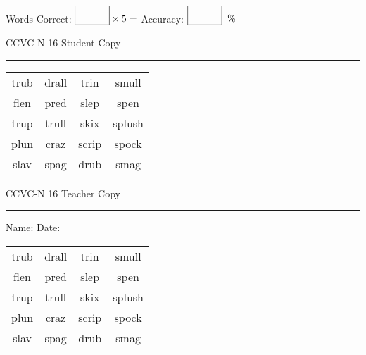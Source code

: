 \documentclass{memoir}
\begin{document}
\small

Words Correct: $\fbox{\phantom{\huge 100}} \times 5 = $ Accuracy: $\fbox{\phantom{\huge 100}}\;\; \%$ 

\vfill

\newpage


\footnotesize \noindent
CCVC-N 16 \hfill Student Copy
\smallskip
\hrule

\Large

\setlength{\tabcolsep}{14pt}
\def\arraystretch{3}

{\selectfont


\begin{vplace}[0.5]
\begin{center}
\begin{tabular}{cccc}
trub & drall & trin & smull \\
flen & pred & slep            & spen \\
trup       & trull & skix & splush \\
plun & craz        & scrip & spock \\
slav & spag          & drub             & smag \\
\end{tabular}
\end{center}
\end{vplace}

}

\newpage

\footnotesize \noindent
CCVC-N 16 \hfill Teacher Copy
\smallskip
\hrule

\small

\vfill

\noindent
Name: \underline{\hspace{1.75in}} \hfill Date: \underline{\hspace{1in}}

\Large

{\selectfont


\begin{vplace}[0.5]
\begin{center}
\begin{tabular}{cccc}
trub & drall & trin & smull \\
flen & pred & slep            & spen \\
trup       & trull & skix & splush \\
plun & craz        & scrip & spock \\
slav & spag          & drub             & smag \\
\end{tabular}
\end{center}
\end{vplace}



}
\end{document}
